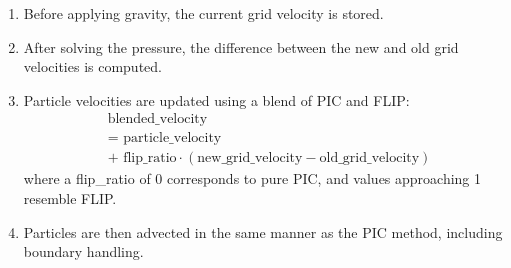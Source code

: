 \begin{enumerate}
\item Before applying gravity, the current grid velocity is stored.

\item After solving the pressure, the difference between the new and old grid velocities is computed.

\item Particle velocities are updated using a blend of PIC and FLIP:
\begin{equation}
  \begin{aligned}
  &\text{blended\_velocity} \\
  &= \text{ particle\_velocity} \\
  &+ \text{ flip\_ratio} \cdot (\text{new\_grid\_velocity} - \text{old\_grid\_velocity})
  \end{aligned}
\end{equation}
where a flip\_ratio of 0 corresponds to pure PIC, and values approaching 1 resemble FLIP.

\item Particles are then advected in the same manner as the PIC method, including boundary handling.
\end{enumerate}